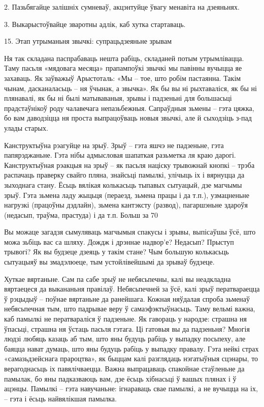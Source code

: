 2. Пазьбягайце залішніх сумневаў, акцэнтуйце ўвагу менавіта на дзеяньнях.

3. Выкарыстоўвайце зваротны адлік, каб хутка стартаваць.


15. Этап утрыманьня звычкі: супрацьдзеяньне зрывам

Ня так складана паспрабаваць нешта рабіць, складаней потым утрымлівацца. Таму пасьля «мядовага месяца» прапампоўкі звычкі мы павінны вучыцца яе захаваць. Як заўважыў Арыстоталь: «Мы – тое, што робім пастаянна. Такім чынам, дасканаласьць – ня ўчынак, а звычка». Як бы вы ні рыхтаваліся, як бы ні плянавалі, як бы ні былі матываваныя, зрывы і падзеньні для большасьці прадстаўнікоў роду чалавечага непазьбежныя. Сапраўдныя зьмены – гэта цяжка, бо вам даводзіцца ня проста выпрацоўваць новыя звычкі, але й сыходзіць з-пад улады старых.

Канструктыўна рэагуйце на зрыў. Зрыў – гэта яшчэ не падзеньне, гэта папярэджаньне. Гэта нібы адмысловая шапаткая разьметка ля краю дарогі. Канструктыўная рэакцыя на зрыў – як пасьля націску трывожнай кнопкі – трэба распачаць праверку свайго пляна, знайсьці памылкі, улічыць іх і вярнуцца да зыходнага стану. Ёсьць вялікая колькасьць тыпавых сытуацый, дзе магчымы зрыў. Гэта зьмена ладу жыцьця (пераезд, зьмена працы і да т.п.), узмацненьне нагрузкі (працоўны дэдлайн), зьмена кантэксту (развод), пагаршэньне здароўя (недасып, траўма, прастуда) і да т.п. Больш за 70%

Вы можаце загадзя сымуляваць магчымыя спакусы і зрывы, выпісаўшы ўсё, што можа зьбіць вас са шляху. Дождж і дрэннае надвор'е? Недасып? Прыступ трывогі? Як вы будзеце дзеяць у такім стане? Чым большую колькасьць сытуацыяў вы змадэлюеце, тым устойлівейшымі да зрываў будзеце.

Хуткае вяртаньне. Сам па сабе зрыў не небясьпечны, калі вы неадкладна вяртаецеся да выкананьня правілаў. Небясьпечней за ўсё, калі зрыў ператвараецца ў рэцыдыў – поўнае вяртаньне да ранейшага. Кожная няўдалая спроба зьменаў небясьпечная тым, што падрывае веру ў самаэфэктыўнасьць. Таму вельмі важна, каб памылкі не ператвараліся ў падзеньне. Як гавораць у народзе: страшна ня ўпасьці, страшна ня ўстаць пасьля гэтага. Ці гатовыя вы да падзеньня? Многія людзі любяць казаць аб тым, што яны будуць рабіць у выпадку посьпеху, але баяцца нават думаць, што яны будуць рабіць у выпадку правалу. Гэта нейкі страх «самазьдзейснага прароцтва», як быццам калі разглядаць нэгатыўныя сцэнары, то верагоднасьць іх павялічваецца. Важна выпрацаваць спакойнае стаўленьне да памылак, бо яны падказваюць вам, дзе ёсьць хібнасьці ў вашых плянах і ў ацэнцы. Памылкі – гэта навучаньне: ігнараваць свае памылкі, а не вучыцца на іх, – гэта і ёсьць найвялікшая памылка.

